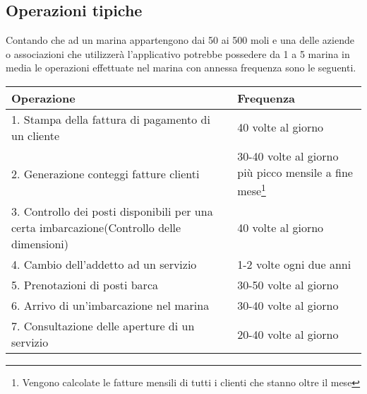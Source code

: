 \subsection{Operazioni tipiche}
Contando che ad un marina appartengono dai 50 ai 500 moli e una delle aziende o associazioni che utilizzerà l'applicativo potrebbe possedere da 1 a 5 marina in media le operazioni effettuate nel marina con annessa frequenza sono le seguenti.
\begin{center}
    \begin{tabularx}{\textwidth}{|p{90mm}|X|}
        \hline
        \rowcolor{gray!30}
        \textbf{Operazione} & \textbf{Frequenza}\\
        \hline
        1. Stampa della fattura di pagamento di un cliente & 40 volte al giorno\\

        \hline
        2. Generazione conteggi fatture clienti & 30-40 volte al giorno più picco mensile a fine mese\footnote{Vengono calcolate le fatture mensili di tutti i clienti che stanno oltre il mese}\\

        \hline
        3. Controllo dei posti disponibili per una certa imbarcazione(Controllo delle dimensioni)& 40 volte al giorno\\

        \hline
        4. Cambio dell'addetto ad un servizio & 1-2 volte ogni due anni\\

        \hline
        5. Prenotazioni di posti barca & 30-50 volte al giorno\\

        \hline
        6. Arrivo di un'imbarcazione nel marina & 30-40 volte al giorno\\

        \hline
        7. Consultazione delle aperture di un servizio & 20-40 volte al giorno\\

        \hline
    \end{tabularx}
\end{center}
